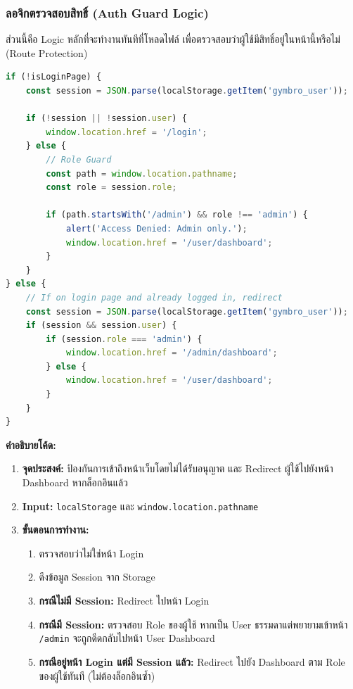 \subsubsection{ลอจิกตรวจสอบสิทธิ์ (Auth Guard Logic)}
ส่วนนี้คือ Logic หลักที่จะทำงานทันทีที่โหลดไฟล์ เพื่อตรวจสอบว่าผู้ใช้มีสิทธิ์อยู่ในหน้านี้หรือไม่ (Route Protection)

\begin{lstlisting}[language=JavaScript, caption={ซอร์สโค้ดจากไฟล์ frontend/js/auth.js: Auth Guard Logic}, label={code:auth-js-guard}]
if (!isLoginPage) {
    const session = JSON.parse(localStorage.getItem('gymbro_user'));
    
    if (!session || !session.user) {
        window.location.href = '/login';
    } else {
        // Role Guard
        const path = window.location.pathname;
        const role = session.role;

        if (path.startsWith('/admin') && role !== 'admin') {
            alert('Access Denied: Admin only.');
            window.location.href = '/user/dashboard';
        } 
    }
} else {
    // If on login page and already logged in, redirect
    const session = JSON.parse(localStorage.getItem('gymbro_user'));
    if (session && session.user) {
        if (session.role === 'admin') {
            window.location.href = '/admin/dashboard';
        } else {
            window.location.href = '/user/dashboard';
        }
    }
}
\end{lstlisting}

\textbf{คำอธิบายโค้ด:}
\begin{enumerate}
    \item \textbf{จุดประสงค์:} ป้องกันการเข้าถึงหน้าเว็บโดยไม่ได้รับอนุญาต และ Redirect ผู้ใช้ไปยังหน้า Dashboard หากล็อกอินแล้ว
    \item \textbf{Input:} \texttt{localStorage} และ \texttt{window.location.pathname}
    \item \textbf{ขั้นตอนการทำงาน:}
    \begin{enumerate}
        \item ตรวจสอบว่าไม่ใช่หน้า Login
        \item ดึงข้อมูล Session จาก Storage
        \item \textbf{กรณีไม่มี Session:} Redirect ไปหน้า Login
        \item \textbf{กรณีมี Session:} ตรวจสอบ Role ของผู้ใช้ หากเป็น User ธรรมดาแต่พยายามเข้าหน้า \texttt{/admin} จะถูกดีดกลับไปหน้า User Dashboard
        \item \textbf{กรณีอยู่หน้า Login แต่มี Session แล้ว:} Redirect ไปยัง Dashboard ตาม Role ของผู้ใช้ทันที (ไม่ต้องล็อกอินซ้ำ)
    \end{enumerate}
\end{enumerate}

